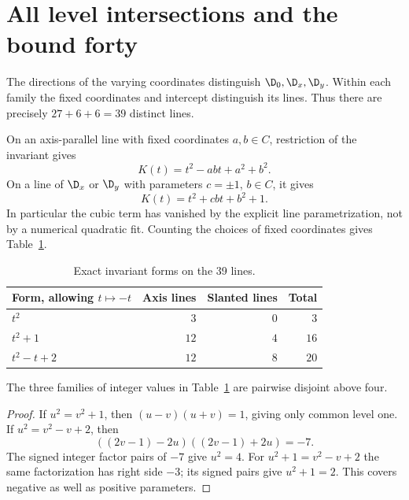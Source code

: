 \section{All level intersections and the bound forty}\label{sec:levels}

The directions of the varying coordinates distinguish
$\D_0,\D_x,\D_y$. Within each family the fixed coordinates
and intercept distinguish its lines. Thus there are precisely
$27+6+6=39$ distinct lines.

On an axis-parallel line with fixed coordinates $a,b\in C$,
restriction of the invariant gives
\begin{equation}\label{eq:axisform}
 K(t)=t^2-abt+a^2+b^2.
\end{equation}
On a line of $\D_x$ or $\D_y$ with parameters $c=\pm1$,
$b\in C$, it gives
\begin{equation}\label{eq:slantform}
 K(t)=t^2+cbt+b^2+1.
\end{equation}
In particular the cubic term has vanished by the explicit
line parametrization, not by a numerical quadratic fit.
Counting the choices of fixed coordinates gives
Table~\ref{tab:forms}.

\begin{table}[tb]
\centering
\begin{tabular}{@{}lrrr@{}}
\toprule
Form, allowing $t\mapsto-t$ & Axis lines & Slanted lines & Total\\
\midrule
$t^2$ & $3$ & $0$ & $3$\\
$t^2+1$ & $12$ & $4$ & $16$\\
$t^2-t+2$ & $12$ & $8$ & $20$\\
\bottomrule
\end{tabular}
\caption{Exact invariant forms on the 39 lines.}
\label{tab:forms}
\end{table}

\begin{lemma}\label{lem:leveloverlap}
The three families of integer values in Table~\ref{tab:forms}
are pairwise disjoint above four.
\end{lemma}

\begin{proof}
If $u^2=v^2+1$, then $(u-v)(u+v)=1$, giving only common
level one. If $u^2=v^2-v+2$, then
\[
 ((2v-1)-2u)((2v-1)+2u)=-7.
\]
The signed integer factor pairs of $-7$ give $u^2=4$.
For $u^2+1=v^2-v+2$ the same factorization has right
side $-3$; its signed pairs give $u^2+1=2$.
This covers negative as well as positive parameters.
\end{proof}

